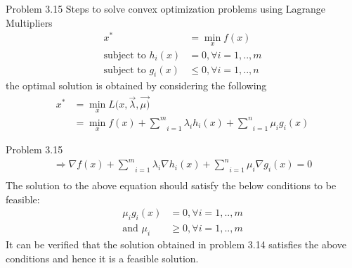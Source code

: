 \documentclass{beamer}
\begin{document}
\begin{frame}{Problem 3.15}
Steps to solve convex optimization problems using Lagrange Multipliers  
    \begin{align}
	x^* &= \min_xf(x)
	\\
	\text{subject to } h_i(x) &= 0, \forall i=1,..,m
	\\
	\text{subject to } g_i(x) &\le 0, \forall i=1,..,n
	\end{align}
	the optimal solution is obtained by considering the following
	\begin{align}
	x^* &= \min_xL(x,\vec{\lambda},\vec{\mu)} 
\\
&= \min_xf(x)  + \underset{i=1}{\overset{m}{\sum}} \lambda_i h_i(x) + \underset{i=1}{\overset{n}{\sum}} \mu_i g_i(x)
\end{align}

\end{frame}

\begin{frame}{Problem 3.15}
\begin{align}
\Rightarrow \nabla f(x) +\underset{i=1}{\overset{m}{\sum}}\lambda_i \nabla  h_i(x) + \underset{i=1}{\overset{n}{\sum}} \mu_i \nabla   g_i(x) = 0
\\
\end{align}
The solution to the above equation should satisfy the below conditions to be feasible:
\begin{align}
 \mu_i g_i(x) &= 0, \forall i=1,..,m
	\\
\text{and } \mu_i &\ge 0, \forall i=1,..,m
\end{align}
It can be verified that the solution obtained in problem 3.14 satisfies the above conditions and hence it is a feasible solution.
\end{frame}
\end{document}
